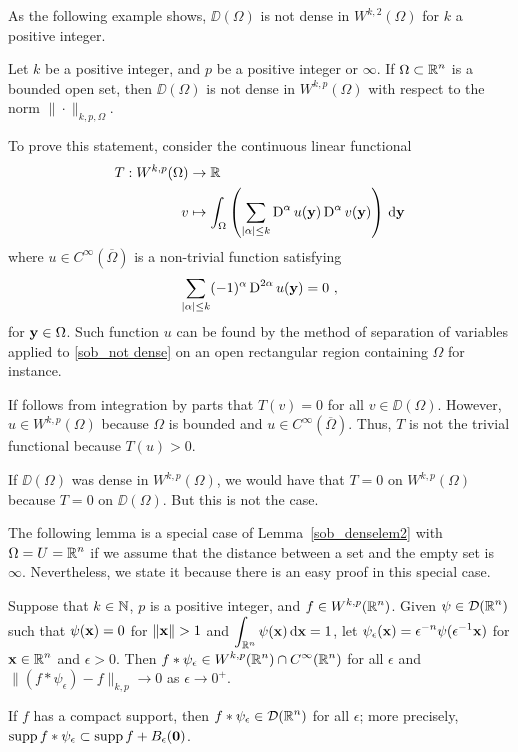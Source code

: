 As the following example shows, $\DD(\Omega)$ is not dense in
$\displaystyle W^{k,2}(\Omega)$ for $k$ a positive integer.

\begin{egg}
Let $k$ be a positive integer, and $p$ be a positive integer or $\infty$. 
If $\displaystyle \Omega \subset \mathbb{R}^n$ is a bounded open set, then
$\DD(\Omega)$ is not dense in $\displaystyle W^{k,p}(\Omega)$ with
respect to the norm $\|\cdot\|_{k,p,\Omega}$.

To prove this statement, consider the continuous linear functional
\begin{align*}
T: W^{k,p}(\Omega) & \rightarrow \mathbb{R} \\
v &\mapsto \int_{\Omega} \left( \sum_{|\alpha|\leq k} \operatorname{D}^\alpha u(\mathbf{y})
\operatorname{D}^\alpha v(\mathbf{y})\right) \,\mathrm{d}{\mathbf{y}}
\end{align*}
where $\displaystyle u \in C^\infty(\overline{\Omega})$ is a
non-trivial function satisfying
\begin{equation} \label{sob_not dense}
\sum_{|\alpha|\leq k} (-1)^\alpha \operatorname{D}^{2\alpha} u(\mathbf{y}) = 0 \  ,
\end{equation}
for $\mathbf{y} \in \Omega$.  Such function $u$ can be found by the
method of separation of variables applied to \ref{sob_not dense} on an
open rectangular region containing $\Omega$ for instance.

If follows from integration by parts that
$\displaystyle T(v)=0$ for all $v\in \DD(\Omega)$.
However, $\displaystyle u \in W^{k,p}(\Omega)$ because $\Omega$ is bounded and
$\displaystyle u \in C^\infty(\overline{\Omega})$.  Thus,
$T$ is not the trivial functional because $T(u) >0$.

If $\DD(\Omega)$ was dense in $\displaystyle W^{k,p}(\Omega)$, we
would have that $T=0$ on $\displaystyle W^{k,p}(\Omega)$ because $T=0$ on
$\DD(\Omega)$.  But this is not the case.
\end{egg}

The following lemma is a special case of Lemma~\ref{sob_denselem2}
with $\displaystyle \Omega = U = \mathbb{R}^n$ if we assume that the distance
between a set and the empty set is $\infty$.  Nevertheless, we state
it because there is an easy proof in this special case.

\begin{lemma} \label{sob_denselem5}
Suppose that $k\in \mathbb{N}$, $p$ is a positive integer, and
$\displaystyle f \in W^{k,p}(\mathbb{R}^n)$.
Given $\displaystyle \psi \in \mathcal{D}(\mathbb{R}^n)$ such that
$\psi(\mathbf{x}) = 0$ for $\|\VEC{x}\|>1$ and
$\displaystyle \int_{\mathbb{R}^n} \psi(\mathbf{x})\,\mathrm{d}{\mathbf{x}} = 1$, let
$\displaystyle \psi_\epsilon(\mathbf{x}) = \epsilon^{-n} \psi(\epsilon^{-1}\mathbf{x})$
for $\displaystyle \mathbf{x} \in \mathbb{R}^n$ and $\epsilon > 0$.
Then
$\displaystyle f\ast \psi_{\epsilon} \in W^{k,p}(\mathbb{R}^n) \cap C^\infty(\mathbb{R}^n)$
for all
$\epsilon$ and $\displaystyle \| \left( f \ast \psi_{\epsilon} \right)
- f\|_{k,p} \rightarrow 0$ as $\epsilon \rightarrow 0^+$.

If $f$ has a compact support, then
$\displaystyle f \ast \psi_{\epsilon} \in \mathcal{D}(\mathbb{R}^n)$ for all $\epsilon$;
more precisely,
$\operatorname{supp} f\ast \psi_\epsilon \subset \operatorname{supp} f + B_\epsilon(\mathbf{0})$.
\end{lemma}

